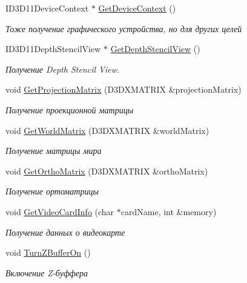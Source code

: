 \begin{DoxyCompactItemize}
I\+D3\+D11\+Device\+Context $\ast$ \hyperlink{class_d3_d_class_a1d0ac6cc358094b68afa7637c95ec47e}{Get\+Device\+Context} ()
\begin{DoxyCompactList}\small\item\em Тоже получение графического устройства, но для других целей \end{DoxyCompactList}\item 
I\+D3\+D11\+Depth\+Stencil\+View $\ast$ \hyperlink{class_d3_d_class_a4ed06b1e5f3e83fc73fccbd7a37ccded}{Get\+Depth\+Stencil\+View} ()
\begin{DoxyCompactList}\small\item\em Получение Depth Stencil View. \end{DoxyCompactList}\item 
void \hyperlink{class_d3_d_class_aba9f3e5ea8fd688c1c07b74fd389b002}{Get\+Projection\+Matrix} (D3\+D\+X\+M\+A\+T\+R\+IX \&projection\+Matrix)
\begin{DoxyCompactList}\small\item\em Получение проекционной матрицы \end{DoxyCompactList}\item 
void \hyperlink{class_d3_d_class_a9e03cd266851c9e45e989577341a8f2b}{Get\+World\+Matrix} (D3\+D\+X\+M\+A\+T\+R\+IX \&world\+Matrix)
\begin{DoxyCompactList}\small\item\em Получение матрицы мира \end{DoxyCompactList}\item 
void \hyperlink{class_d3_d_class_a7227e509b814c581f9e9360c408f64d3}{Get\+Ortho\+Matrix} (D3\+D\+X\+M\+A\+T\+R\+IX \&ortho\+Matrix)
\begin{DoxyCompactList}\small\item\em Получение ортоматрицы \end{DoxyCompactList}\item 
void \hyperlink{class_d3_d_class_a5ff051847f9653231d9d0a001e7c67c6}{Get\+Video\+Card\+Info} (char $\ast$card\+Name, int \&memory)
\begin{DoxyCompactList}\small\item\em Получение данных о видеокарте \end{DoxyCompactList}\item 
void \hyperlink{class_d3_d_class_acbe3fe3e9680dff2a67e1c3fb82efddf}{Turn\+Z\+Buffer\+On} ()
\begin{DoxyCompactList}\small\item\em Включение Z-\/буффера \end{DoxyCompactList}\item 

\end{DoxyCompactItemize}
